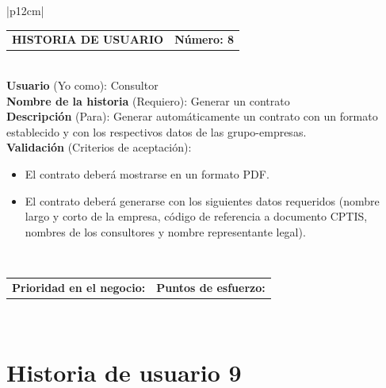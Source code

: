 \documentclass[11pt,letterpaper]{report}
\begin{document}
	\begin{center}	
		\begin{tabular}{|p{12cm}|}
			\hline
			\begin{tabular}{c|c}
				\textbf{HISTORIA DE USUARIO} & \textbf{Número: 8} \\
			\end{tabular} \\ \hline
			\textbf{Usuario} (Yo como): Consultor \\ \hline
			\textbf{Nombre de la historia} (Requiero): Generar un contrato \\ \hline
			\textbf{Descripción} (Para): Generar automáticamente un contrato con un formato establecido y con los respectivos datos de las grupo-empresas.\\ \hline
			\textbf{Validación} (Criterios de aceptación): \\
			\begin{minipage}{12cm}
				\begin{itemize}
					\item El contrato deberá mostrarse en un formato PDF.
					\item El contrato deberá generarse con los siguientes datos requeridos (nombre largo y corto de la empresa, código de referencia a documento CPTIS, nombres de los consultores y nombre representante legal).
				\end{itemize}
			\end{minipage} \\ \hline
			\begin{tabular}{c|c}
				\textbf{Prioridad en el negocio: } & \textbf{Puntos de esfuerzo: } \\
			\end{tabular} \\ \hline
		\end{tabular}
	\end{center}
	
	\section{Historia de usuario 9}
	
\end{document}
